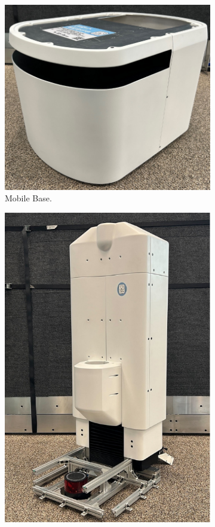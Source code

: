 \documentclass[runningheads,a4paper]{llncs}
\begin{document}
\begin{figure}[tbp]
\begin{minipage}[b]{0.25\linewidth}
\begin{subfigure}[b]{\linewidth}
			\includegraphics[width=\linewidth]{images/component_base.png}
			\caption{Mobile Base.}
			\label{fig:component_base}
		\end{subfigure}
		\begin{subfigure}[b]{\linewidth}
			\includegraphics[width=\linewidth]{images/component_torso.png}

\end{subfigure}
\end{minipage}
\end{figure}
\end{document}
